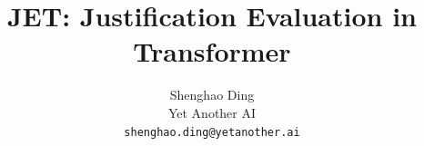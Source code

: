 \documentclass[10pt,letterpaper]{article}
\title{JET: Justification Evaluation in Transformer}
\author{Shenghao Ding\\Yet Another AI\\
\texttt{shenghao.ding@yetanother.ai}}
\date{}
\begin{document}
\maketitle
\begin{abstract}

\end{abstract}









\begingroup
\small


\endgroup
\clearpage
\appendix

\end{document}
